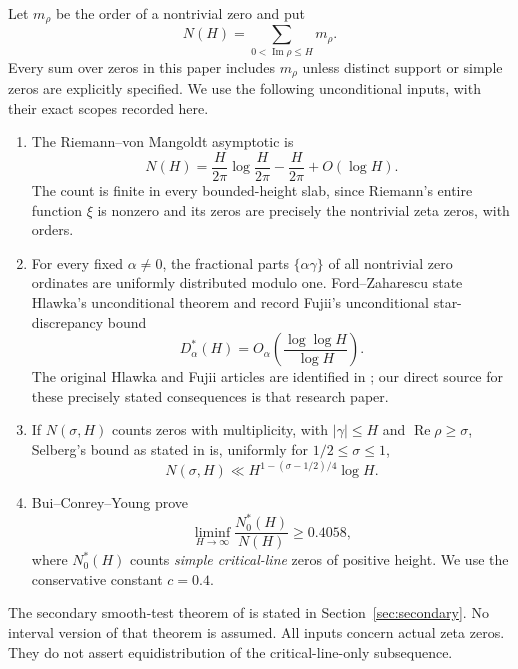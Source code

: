 \documentclass[11pt,a4paper]{article}
\theoremstyle{definition}
\theoremstyle{remark}
\DeclareMathOperator{\Rea}{Re}
\DeclareMathOperator{\Ima}{Im}
\begin{document}
Let $m_\rho$ be the order of a nontrivial zero and put
\[
 N(H)=\sum_{0<\Ima\rho\le H}m_\rho.
\]
Every sum over zeros in this paper includes $m_\rho$ unless distinct support
or simple zeros are explicitly specified. We use the following unconditional
inputs, with their exact scopes recorded here.

\begin{enumerate}
\item The Riemann--von Mangoldt asymptotic is
\begin{equation}\label{eq:rvm}
 N(H)=\frac{H}{2\pi}\log\frac{H}{2\pi}-\frac{H}{2\pi}+O(\log H).
\end{equation}
The count is finite in every bounded-height slab, since Riemann's entire
function $\xi$ is nonzero and its zeros are precisely the nontrivial zeta
zeros, with orders.
\item For every fixed $\alpha\ne0$, the fractional parts $\{\alpha\gamma\}$
of all nontrivial zero ordinates are uniformly distributed modulo one.
Ford--Zaharescu \cite[Introduction]{FZ} state Hlawka's unconditional theorem
and record Fujii's unconditional star-discrepancy bound
\begin{equation}\label{eq:fujii}
 D_\alpha^*(H)=O_\alpha\!\left(\frac{\log\log H}{\log H}\right).
\end{equation}
The original Hlawka and Fujii articles are identified in \cite{FZ}; our direct
source for these precisely stated consequences is that research paper.
\item If $N(\sigma,H)$ counts zeros with multiplicity, with $|\gamma|\le H$ and
$\Rea\rho\ge\sigma$, Selberg's bound as stated in
\cite[Lemma 2]{FZ} is, uniformly for $1/2\le\sigma\le1$,
\begin{equation}\label{eq:density}
 N(\sigma,H)\ll H^{1-(\sigma-1/2)/4}\log H.
\end{equation}
\item Bui--Conrey--Young \cite[Theorem 1.1]{BCY} prove
\begin{equation}\label{eq:bcy}
 \liminf_{H\to\infty}\frac{N_0^*(H)}{N(H)}\ge0.4058,
\end{equation}
where $N_0^*(H)$ counts \emph{simple critical-line} zeros of positive height.
We use the conservative constant $c=0.4$.
\end{enumerate}
The secondary smooth-test theorem of \cite{FZ} is stated in
Section~\ref{sec:secondary}. No interval version of that theorem is assumed.
All inputs concern actual zeta zeros. They do not assert equidistribution
of the critical-line-only subsequence.
\end{document}
